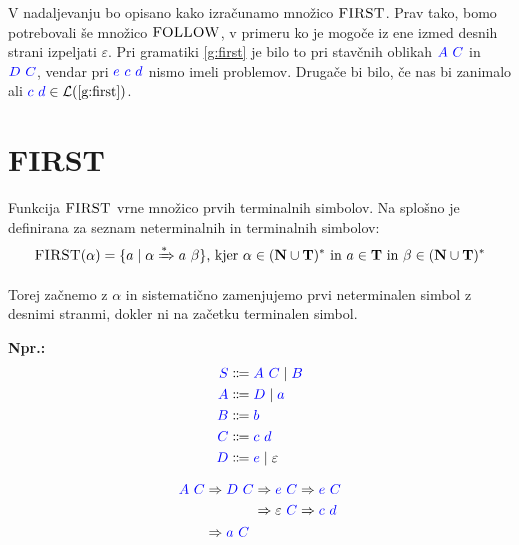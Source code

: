 \documentclass{article}
\newcommand{\Ex}{\textbf{Npr.:}\ }
\newcommand{\FIRST}{\textsc{FIRST}}
\newcommand{\FOLLOW}{\textsc{FOLLOW}}
\newcommand{\Set}[1]{\mathbf{#1}}
\newcommand{\Symbol}[1]{\textcolor{blue}{#1}}
\newcommand{\Terminals}{\Set{T}}
\newcommand{\NonTerminals}{\Set{N}}
\newcommand{\Null}{\varepsilon}
\newcommand{\Language}[1]{\mathcal{L}(#1)}
\newcommand{\Arrow}{\Coloneqq}
\newcommand{\Derive}{\Rightarrow}
\newcommand{\DeriveStar}{\xRightarrow{\ast}}
\newcommand{\Seq}{\ }
\newcommand{\Union}{\mathrel{|}}
\newcommand{\Kleene}[1]{#1^\ast}
\begin{document}
V nadaljevanju bo opisano kako izračunamo množico $\FIRST$.
Prav tako, bomo potrebovali še množico $\FOLLOW$, v primeru ko je mogoče iz ene izmed desnih strani izpeljati $\Null$.
Pri gramatiki \ref{g:first} je bilo to pri stavčnih oblikah $\Symbol{A} \Seq \Symbol{C}$ in $\Symbol{D} \Seq \Symbol{C}$, vendar pri $\Symbol{e} \Seq \Symbol{c} \Seq \Symbol{d}$ nismo imeli problemov.
Drugače bi bilo, če nas bi zanimalo ali $\Symbol{c} \Seq \Symbol{d} \in \Language{\text{\ref{g:first}}}$.

\section{\FIRST}

Funkcija $\FIRST$ vrne množico prvih terminalnih simbolov.
Na splošno je definirana za seznam neterminalnih in terminalnih simbolov:
\begin{equation*}
  \FIRST(\alpha) = \{ a \mid \alpha \DeriveStar a \Seq \beta \} \text{, kjer } \alpha \in \Kleene{(\NonTerminals \cup \Terminals)} \text{ in } a \in \Terminals \text{ in } \beta \in \Kleene{(\NonTerminals \cup \Terminals)}
\end{equation*}

Torej začnemo z $\alpha$ in sistematično zamenjujemo prvi neterminalen simbol z desnimi stranmi, dokler ni na začetku terminalen simbol.

\Ex
\begin{equation*}
  \begin{aligned}
    \Symbol{S} &\Arrow \Symbol{A} \Seq \Symbol{C} \Union \Symbol{B} \\
    \Symbol{A} &\Arrow \Symbol{D} \Union \Symbol{a} \\
    \Symbol{B} &\Arrow \Symbol{b}\\
    \Symbol{C} &\Arrow \Symbol{c} \Seq \Symbol{d}\\
    \Symbol{D} &\Arrow \Symbol{e} \Union \Null
  \end{aligned}
\end{equation*}

\begin{equation*}
  \Symbol{A} \Seq \Symbol{C} \begin{aligned}[t]
    &\Derive \Symbol{D} \Seq \Symbol{C} \begin{aligned}[t]
      &\Derive \Symbol{e} \Seq \Symbol{C} \Derive \Symbol{e} \Seq \Symbol{C} \\
      &\Derive \Null \Seq \Symbol{C} \Derive \Symbol{c} \Seq \Symbol{d} \\
    \end{aligned}\\
    &\Derive \Symbol{a} \Seq \Symbol{C}
  \end{aligned}
\end{equation*}
\end{document}
